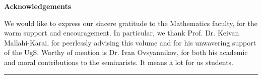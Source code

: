       \vspace{0.3cm}

  {\large\bfseries\color{cmjcrimson}Acknowledgements}

    \vspace{0.3cm}

    We would like to express our sincere gratitude to the Mathematics faculty, for the warm support
    and encouragement. In particular, we thank Prof. Dr. Keivan Mallahi-Karai, for peerlessly advising
    this volume and for his unwavering support of the UgS\@. Worthy of mention is Dr. Ivan Ovsyannikov, for both his academic and moral 
    contributions to the seminarists. It means a lot for us students. 
    
\vspace{0.15cm}

\noindent\textcolor{cmjgold}{\rule{\textwidth}{1.2pt}}

\vspace{0.6cm}
\newpage